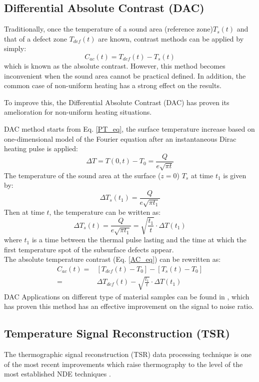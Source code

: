 \subsection{Differential Absolute Contrast (DAC)}
Traditionally, once the temperature of a sound area (reference zone)$T_s(t) $ and that of a defect zone $T_{def}(t) $ are known, contrast methods can be applied by simply:
\begin{equation}
C_{ac}(t) = T_{def}(t) - T_s(t)
\label{AC_eq}
\end{equation}
which is known as the absolute contrast. However, this method becomes inconvenient when the sound area cannot be practical defined. In addition, the common case of non-uniform heating has a strong effect on the results.

To improve this, the Differential Absolute Contrast (DAC) has proven its amelioration for non-uniform heating situations\citep{Benitez2008, pilla2002new}.

DAC method starts from Eq. \ref{PT_eq}, the surface temperature increase based on one-dimensional model of the Fourier equation after an instantaneous Dirac heating pulse is applied:
\begin{equation}
\Delta T = T(0,t) - T_0  = \frac{Q}{e\sqrt{\pi t}}
\label{PT_eq_2}
\end{equation}
The temperature of the sound area at the surface ($z=0$) $T_s$ at time $t_1$ is given by:
\begin{equation}
\Delta T_s(t_1) = \frac{Q}{e\sqrt{\pi t_1}}
\end{equation}
Then at time $t$, the temperature can be written as:
\begin{equation}
\Delta T_s(t) = \frac{Q}{e\sqrt{\pi t_1}} = \sqrt{\frac{t_1}{t}}\cdot \Delta T(t_1)
\end{equation}
where $t_1$ is a time between the thermal pulse lasting and the time at which the first temperature spot of the subsurface defects appear.\\
The absolute temperature contrast (Eq. \ref{AC_eq}) can be rewritten as:
\begin{align}
C_{ac}(t) = & [T_{def}(t) -T_0] - [T_s(t) - T_0] \\ 
		  = & \Delta T_{def}(t) - \sqrt{\frac{t_1}{t}}\cdot \Delta T(t_1)
\end{align}
DAC Applications on different type of material samples can be found in \citep{pilla2002new}, which has proven this method has an effective improvement on the signal to noise ratio.

\subsection{Temperature Signal Reconstruction (TSR)}
The thermographic signal reconstruction (TSR) data processing technique is one of the most recent improvements which raise thermography to the level of the most established NDE techniques \citep{shepard2003reconstruction, Balageas2015}.

